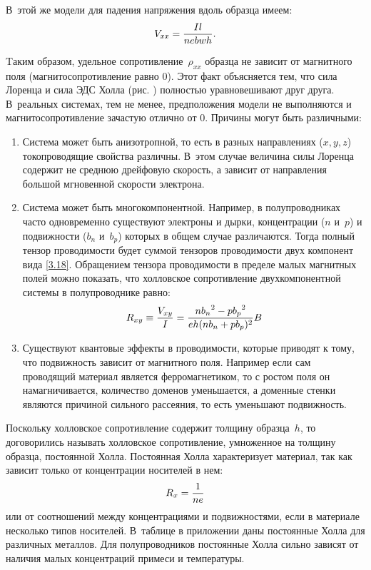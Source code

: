 В~этой же модели для падения напряжения вдоль образца имеем:
\begin{equation}
	V_{xx}=\frac{Il}{nebwh}.
	\eqmark{3.20}
\end{equation}

Tаким образом, удельное сопротивление~$\rho_{xx}$ образца не зависит от
магнитного поля (магнитосопротивление равно 0). Этот факт объясняется тем, что
сила Лоренца и сила ЭДС Холла (рис. ) полностью
уравновешивают друг друга. В~реальных системах, тем не менее, предположения
модели не выполняются и магнитосопротивление зачастую отлично от 0. Причины
могут быть различными:
\begin{enumerate}
\item Система может быть анизотропной, то есть в разных направлениях ($x,y,z$)
токопроводящие свойства различны. В~этом случае величина силы Лоренца содержит
не среднюю дрейфовую скорость, а зависит от направления большой мгновенной
скорости электрона.

\item Система может быть многокомпонентной. Например, в полупроводниках часто
одновременно существуют электроны и дырки, концентрации ($n$ и~$p$) и
подвижности ($b_n$ и~$b_p$) которых в общем случае различаются. Тогда полный
тензор проводимости будет суммой тензоров проводимости двух компонент вида
\eqref{3.18}. Обращением тензора проводимости в пределе малых магнитных полей
можно показать, что холловское сопротивление двухкомпонентной системы в
полупроводнике равно:
\begin{equation}
	R_{xy}\equiv \frac{V_{xy}}{I}=\frac{n{b_n}^2-p{b_p}^2}{eh(nb_n+pb_p)^2}B
	\eqmark{3.21}
\end{equation}

\item Существуют квантовые эффекты в проводимости, которые приводят к тому, что
подвижность зависит от магнитного поля. Например если сам проводящий материал
является ферромагнетиком, то с ростом поля он намагничивается, количество
доменов уменьшается, а доменные стенки являются причиной сильного рассеяния, то
есть уменьшают подвижность.
\end{enumerate}

Поскольку холловское сопротивление содержит толщину образца~$h$, то договорились
называть холловское сопротивление, умноженное на толщину образца, постоянной
Холла. Постоянная Холла характеризует материал, так как зависит только от
концентрации носителей в нем:
\begin{equation}
	R_x=\frac{1}{ne}
	\eqmark{HallConstant}
\end{equation}
или от соотношений между концентрациями и подвижностями, если в материале
несколько типов носителей. В~таблице в приложении даны постоянные Холла для
различных металлов. Для полупроводников постоянные Холла сильно зависят от
наличия малых концентраций примеси и температуры.

